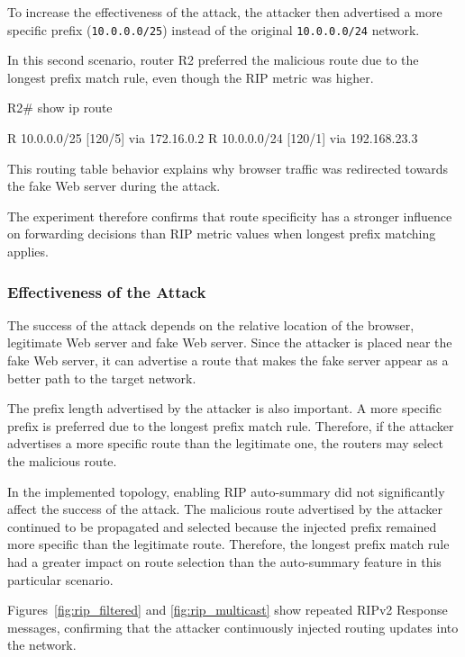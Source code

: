\documentclass[12pt]{article}
\begin{document}
To increase the effectiveness of the attack,
the attacker then advertised a more specific prefix
(\texttt{10.0.0.0/25}) instead of the original
\texttt{10.0.0.0/24} network.

In this second scenario, router R2 preferred
the malicious route due to the longest prefix match rule,
even though the RIP metric was higher.

\begin{configbox}
R2# show ip route

R    10.0.0.0/25 [120/5] via 172.16.0.2
R    10.0.0.0/24 [120/1] via 192.168.23.3
\end{configbox}

This routing table behavior explains why browser traffic
was redirected towards the fake Web server during the attack.

The experiment therefore confirms that
route specificity has a stronger influence on forwarding decisions
than RIP metric values when longest prefix matching applies.


\subsubsection{Effectiveness of the Attack}

The success of the attack depends on the relative location of the browser, legitimate Web server and fake Web server. Since the attacker is placed near the fake Web server, it can advertise a route that makes the fake server appear as a better path to the target network.

The prefix length advertised by the attacker is also important. A more specific prefix is preferred due to the longest prefix match rule. Therefore, if the attacker advertises a more specific route than the legitimate one, the routers may select the malicious route.

In the implemented topology, enabling RIP auto-summary did not significantly affect the success of the attack. The malicious route advertised by the attacker continued to be propagated and selected because the injected prefix remained more specific than the legitimate route. Therefore, the longest prefix match rule had a greater impact on route selection than the auto-summary feature in this particular scenario.

Figures~\ref{fig:rip_filtered} and \ref{fig:rip_multicast} show repeated RIPv2 Response messages, confirming that the attacker continuously injected routing updates into the network.
\end{document}
